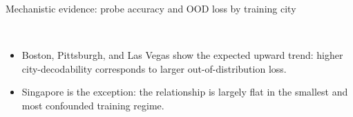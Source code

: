 \documentclass[aspectratio=169, xcolor={table}]{beamer}
\begin{document}
\begin{frame}[shrink=13]{Mechanistic evidence: probe accuracy and OOD loss by training city}
{}
  \\
  \begin{itemize}\footnotesize
    \item Boston, Pittsburgh, and Las Vegas show the expected upward trend: higher city-decodability corresponds to larger out-of-distribution loss.
    \item Singapore is the exception: the relationship is largely flat in the smallest and most confounded training regime.
  \end{itemize}
\end{frame}
\end{document}
